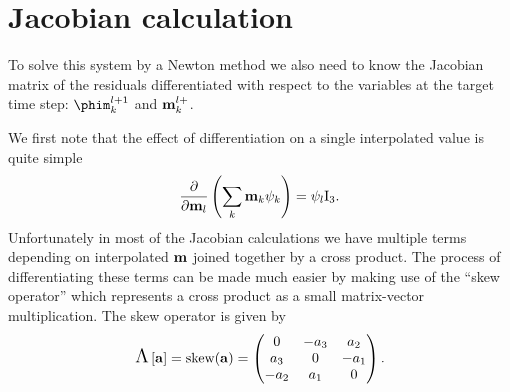 \section{Jacobian calculation}
\label{sec:jacobian-calculation}

To solve this system by a Newton method we also need to know the Jacobian matrix of the residuals differentiated with respect to the variables at the target time step: $\phim_\ik^{\tl+1}$ and $\mathbf{m}_{k}^{l+}$.

We first note that the effect of differentiation on a single interpolated value is quite simple
\begin{equation}
  \frac{\partial }{\partial \mathbf{m}_l} \left( \sum_k \mathbf{m}_k {\psi_k} \right) = \psi_l \text{I}_3.
\end{equation}
Unfortunately in most of the Jacobian calculations we have multiple terms depending on interpolated $\mathbf{m}$ joined together by a cross product.
The process of differentiating these terms can be made much easier by making use of the ``skew operator'' which represents a cross product as a small matrix-vector multiplication.
The skew operator is given by
\begin{equation}
  \text{\Large{$\Lambda$}}\left[ {\mathbf{a}} \right] = \text{skew}({\mathbf{a}}) =
  \begin{pmatrix}
    0 & -a_3 & a_2 \\
    a_3 & 0 & -a_1 \\
    -a_2 & a_1 & 0
  \end{pmatrix}.
  \label{eqn:skew}
\end{equation}

